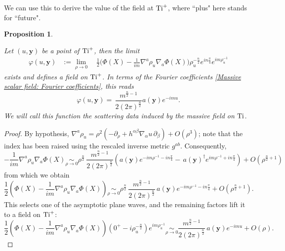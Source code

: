 \documentclass[a4paper, 10pt]{article}
\newtheorem{proposition}{Proposition}[section]
\theoremstyle{remark}
\newcommand{\Ti}{\textnormal{Ti}}
\newcommand{\y}{\bm{y}}
\begin{document}
We can use this to derive the value of the field at $\Ti^{+}$, where ``plus" here stands for ``future".
\begin{proposition}\mbox{}

\label{Proposition::MassiveScalar}

Let $(u, \y )$ be a point of $\Ti^{+}$, then the limit
\begin{align}
    \varphi(u, \y) &:= \lim_{\rho\to 0} \quad \frac{1}{2}\Big(    \Phi(X) - \frac{1}{i m} \nabla^a \rho_u \nabla_a\Phi(X) \Big) \rho_u^{-\frac{n}{2}}e^{in\frac{\pi}{4}} e^{i m \rho_u^{-1}} \label{Eq::AsymptoticScalar1}
\end{align}
exists and defines a field on $\Ti^+$. In terms of the Fourier coefficients \eqref{Massive scalar field: Fourier coefficients}, this reads
\begin{equation}
    \varphi(u, \y) = \, \frac{m^{\frac{n}{2}-1}}{2 (2\pi)^{\frac{n}{2}}}  a(\y) e^{-im u}. \label{Eq::AsymptoticScalar2}
\end{equation}
We will call this function the scattering data induced by the massive field on $\Ti$.
\end{proposition}
\begin{proof}\mbox{}

By hypothesis, $\nabla^a \rho_u = \rho^{2}\left( - \partial_{\rho} + h^{\alpha\beta}\nabla_{\alpha} u \,\partial_{\beta} \right) +O(\rho^3)$; note that the index has been raised using the rescaled inverse metric $g^{ab}$. Consequently,
\begin{equation}
    - \frac{1}{i m}\nabla^a \rho_u \nabla_a\Phi(X) \underset{\rho \to 0}{\sim} \rho^{\frac{n}{2}} \, \frac{m^{\frac{n}{2}-1}}{2 (2\pi)^{\frac{n}{2}}}  \left( a(\y) e^{- im \rho^{-1}-in\frac{\pi}{4}} - \, a(\y)^{\dagger} e^{im \rho^{-1}+in\frac{\pi}{4}} \right)  + O(\rho^{\frac{n}{2}+1} )
\end{equation}
from which we obtain
\begin{equation}
\frac{1}{2}\left(\Phi(X) - \frac{1}{i m}\nabla^a \rho_u \nabla_a\Phi(X) \right) \underset{\rho \to 0}{\sim} \rho^{\frac{n}{2}} \, \frac{m^{\frac{n}{2}-1}}{2 (2\pi)^{\frac{n}{2}}}  \, a(\y) e^{- im \rho^{-1}-in\frac{\pi}{4}}    + O(\rho^{\frac{n}{2}+1} ).
\end{equation}
This selects one of the asymptotic plane waves, and the remaining factors lift it to a field on $\Ti^+$:
\begin{equation}
\frac{1}{2}\left(\Phi(X) - \frac{1}{i m}\nabla^a \rho_u \nabla_a\Phi(X) \right)  (0^+-i\rho_u^{-\frac{n}{2}})  e^{i m  \rho_u^{-1}} \underset{\rho \to 0}{\sim}  \frac{m^{\frac{n}{2}-1}}{2 (2\pi)^{\frac{n}{2}}} \, a(\y) e^{- im u}    + O(\rho).
\end{equation}

\end{proof}
\end{document}
